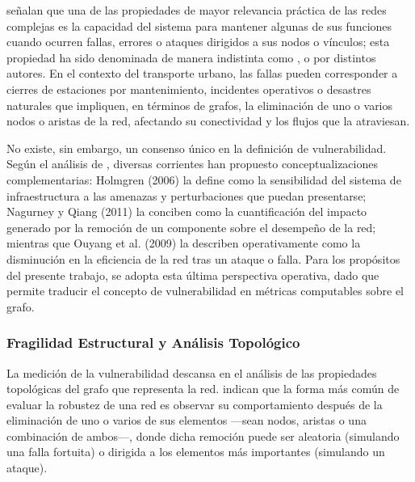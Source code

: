 \textcite{loterovélez2014} señalan que una de las propiedades de mayor relevancia
práctica de las redes complejas es la capacidad del sistema para mantener algunas
de sus funciones cuando ocurren fallas, errores o ataques dirigidos a sus nodos o
vínculos; esta propiedad ha sido denominada de manera indistinta como
,  o  por distintos
autores. En el contexto del transporte urbano, las fallas pueden corresponder a
cierres de estaciones por mantenimiento, incidentes operativos o desastres
naturales que impliquen, en términos de grafos, la eliminación de uno o varios nodos
o aristas de la red, afectando su conectividad y los flujos que la atraviesan.

No existe, sin embargo, un consenso único en la definición de vulnerabilidad. Según
el análisis de \textcite{loterovélez2014}, diversas corrientes han propuesto
conceptualizaciones complementarias: Holmgren (2006) la define como la
sensibilidad del sistema de infraestructura a las amenazas y perturbaciones que
puedan presentarse; Nagurney y Qiang (2011) la conciben como la cuantificación
del impacto generado por la remoción de un componente sobre el desempeño de la
red; mientras que Ouyang et al. (2009) la describen operativamente como la
disminución en la eficiencia de la red tras un ataque o falla. Para los propósitos del
presente trabajo, se adopta esta última perspectiva operativa, dado que permite
traducir el concepto de vulnerabilidad en métricas computables sobre el grafo.

\subsubsection{Fragilidad Estructural y Análisis Topológico}
\label{subsubsec:fragilidad-estructural}

La medición de la vulnerabilidad descansa en el análisis de las propiedades
topológicas del grafo que representa la red. \textcite{loterovélez2014} indican que
la forma más común de evaluar la robustez de una red es observar su comportamiento
después de la eliminación de uno o varios de sus elementos ---sean nodos, aristas o
una combinación de ambos---, donde dicha remoción puede ser aleatoria (simulando
una falla fortuita) o dirigida a los elementos más importantes (simulando un ataque).

